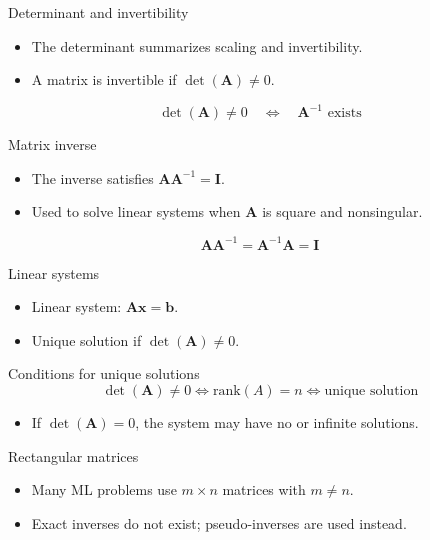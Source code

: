 \documentclass[12pt]{beamer}
\begin{document}
\begin{frame}{Determinant and invertibility}
  \begin{itemize}
    \item The determinant summarizes scaling and invertibility.
    \item A matrix is invertible if $\det(\bm{A}) \ne 0$.
  \end{itemize}
  \[
  \det(\bm{A}) \ne 0 \quad \Longleftrightarrow \quad \bm{A}^{-1} \text{ exists}
  \]
\end{frame}

\begin{frame}{Matrix inverse}
  \begin{itemize}
    \item The inverse satisfies $\bm{A} \bm{A}^{-1} = \bm{I}$.
    \item Used to solve linear systems when $\bm{A}$ is square and nonsingular.
  \end{itemize}
  \[
  \bm{A} \bm{A}^{-1} = \bm{A}^{-1} \bm{A} = \bm{I}
  \]
\end{frame}

\begin{frame}{Linear systems}
  \begin{itemize}
    \item Linear system: $\bm{A} \bm{x} = \bm{b}$.
    \item Unique solution if $\det(\bm{A}) \ne 0$.
  \end{itemize}
\end{frame}

\begin{frame}{Conditions for unique solutions}
  \[
  \det(\bm{A}) \ne 0 \Longleftrightarrow \mathrm{rank}(A) = n
  \Longleftrightarrow \text{unique solution}
  \]
  \begin{itemize}
    \item If $\det(\bm{A}) = 0$, the system may have no or infinite solutions.
  \end{itemize}
\end{frame}

\begin{frame}{Rectangular matrices}
  \begin{itemize}
    \item Many ML problems use $m \times n$ matrices with $m \ne n$.
    \item Exact inverses do not exist; pseudo-inverses are used instead.
  \end{itemize}
\end{frame}
\end{document}
